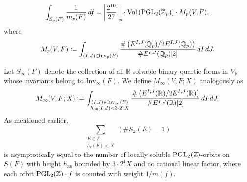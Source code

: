 \documentclass{article}
\def\Z{{\mathbb Z}}
\def\PGL{{\rm PGL}}
\def\Inv{{\rm Inv}}
\def\Vol{{\rm Vol}}
\def\R{{\mathbb R}}
\def\Z{{\mathbb Z}}
\def \h{{\rm ht}}
\begin{document}
\begin{equation}\label{local-density-calc}
    \int_{S_p(F)}\frac{1}{m_p(F)}\, df = \left| \frac{2^{10}}{27} \right|_p \cdot \Vol\left( \text{PGL}_2(\mathbb{Z}_p)\right) \cdot M_p(V, F) ,
\end{equation}
where
\begin{equation*}
    M_p(V, F) \vcentcolon= \int_{(I, J) \in \Inv_p(F)} \frac{\#\left( E^{I,J}(\mathbb{Q}_p) / 2E^{I,J}(\mathbb{Q}_p) \right)}{\#E^{I,J}(\mathbb{Q}_p)[2]} \, dI \, dJ.
\end{equation*}

Let $S_{\infty}(F)$ denote the collection of all $\mathbb{R}$-solvable binary quartic forms in $V_{\mathbb{R}}$ whose invariants belong to $\text{Inv}_{\infty}(F)$. We define $M_{\infty}(V,F;X)$ analogously as  
\begin{equation*}
     M_{\infty}(V,F;X) \vcentcolon= \int_{\substack{(I,J)\in\Inv_{\infty}(F)\\h_{36}(I,J)<3\cdot2^4X}} \frac{\# \left(E^{I,J}(\R)/2E^{I,J}(\R)\right)}{\#E^{I,J}(\R)[2]}\,dI\,dJ.
\end{equation*}
As mentioned earlier,  
\begin{equation*}
        \sum_{\substack{E\in F\\h_e(E)<X}}\left(\#S_2(E)-1\right)
\end{equation*}
is asymptotically equal to the number of locally soluble $\PGL_2(\Z)$-orbits on $S(F)$ with height $h_{36}$ bounded by $3\cdot 2^4X$ and no rational linear factor, where each orbit $\PGL_2(\Z)\cdot f$ is counted with weight $1/m(f)$.  
\end{document}
